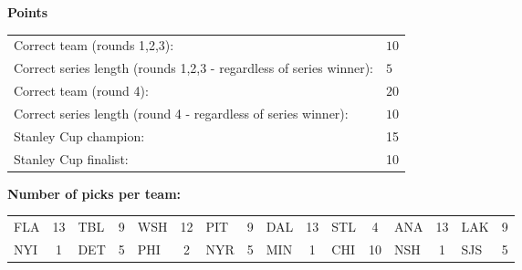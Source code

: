 \documentclass[10pt]{article}
\begin{document}
{\bf Points}\\
\begin{minipage}{12cm}
    \begin{tabular}{l l}
        Correct team (rounds 1,2,3):	& $10$\\
        Correct series length (rounds 1,2,3 - regardless of series winner):	& $5$\\
        Correct team (round 4):	& $20$\\
        Correct series length (round 4 - regardless of series winner):	& $10$\\
        Stanley Cup champion:	& 15\\
        Stanley Cup finalist:	& 10\\
    \end{tabular}

    \vspace{1cm}
    {\bf Number of picks per team:}\\
    \begin{tabular}{lc | lc | lc | lc | lc | lc | lc | lc }
        FLA & 13 & TBL & 9 & WSH & 12 & PIT & 9 & DAL & 13 & STL & 4 & ANA & 13 & LAK & 9 \\
        NYI & 1 & DET & 5 & PHI & 2 & NYR & 5 & MIN & 1 & CHI & 10 & NSH & 1 & SJS & 5 \\
    \end{tabular}
\end{minipage}
\end{document}

